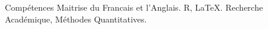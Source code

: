 
\begin{rubric}{Compétences}
\entry*[Languages]
	Maitrise du Francais et l'Anglais.
	R, \LaTeX .
\entry*[Divers]
	Recherche Académique, Méthodes Quantitatives.
\end{rubric}
